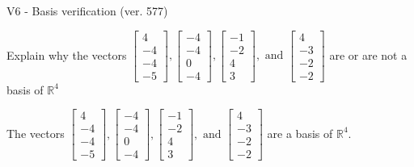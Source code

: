 \begin{exercise}
  \begin{exerciseTitle}V6 - Basis verification (ver. 577)\end{exerciseTitle}
  \begin{exerciseStatement}
    Explain why the vectors \(\left[\begin{array}{r}
4 \\
-4 \\
-4 \\
-5
\end{array}\right] , \left[\begin{array}{r}
-4 \\
-4 \\
0 \\
-4
\end{array}\right] , \left[\begin{array}{r}
-1 \\
-2 \\
4 \\
3
\end{array}\right] , \text{ and } \left[\begin{array}{r}
4 \\
-3 \\
-2 \\
-2
\end{array}\right]\) are or are not a basis of \(\mathbb{R}^4\)	


  \end{exerciseStatement}
  \begin{exerciseAnswer}
   The vectors \(\left[\begin{array}{r}
4 \\
-4 \\
-4 \\
-5
\end{array}\right] , \left[\begin{array}{r}
-4 \\
-4 \\
0 \\
-4
\end{array}\right] , \left[\begin{array}{r}
-1 \\
-2 \\
4 \\
3
\end{array}\right] , \text{ and } \left[\begin{array}{r}
4 \\
-3 \\
-2 \\
-2
\end{array}\right]\) 
  	 are  a basis of \(\mathbb{R}^4\).
  


  \end{exerciseAnswer}
\end{exercise}